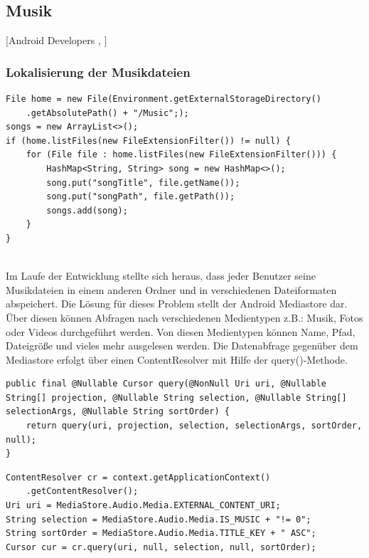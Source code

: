 \documentclass[FIPLY_base.tex]{subfiles}
\begin{document}
\subsection{Musik}
[Android Developers \cite{adMediaPlayer}, \citeauthor{bMediaPlayer} \cite{bMediaPlayer}]

\subsubsection{Lokalisierung der Musikdateien}
\begin{lstlisting}[caption={Ursprünglicher Ansatz zum Lesen aller mp3-Files im Music-Ordner},label=DescriptiveLabel]
File home = new File(Environment.getExternalStorageDirectory()
	.getAbsolutePath() + "/Music";);
songs = new ArrayList<>();
if (home.listFiles(new FileExtensionFilter()) != null) {
	for (File file : home.listFiles(new FileExtensionFilter())) {
		HashMap<String, String> song = new HashMap<>();
		song.put("songTitle", file.getName());
		song.put("songPath", file.getPath());
		songs.add(song);
	}
}    
\end{lstlisting}

\ \\
Im Laufe der Entwicklung stellte sich heraus, dass jeder Benutzer seine Musikdateien in einem anderen Ordner und in verschiedenen Dateiformaten abspeichert. 
Die Lösung für dieses Problem stellt der Android Mediastore dar. 
Über diesen können Abfragen nach verschiedenen Medientypen z.B.: Musik, Fotos oder Videos durchgeführt werden. Von diesen Medientypen können Name, Pfad, Dateigröße und vieles mehr ausgelesen werden.
Die Datenabfrage gegenüber dem Mediastore erfolgt über einen ContentResolver mit Hilfe der query()-Methode.
\begin{lstlisting}[caption={Die query-Methode des Android Source Codes in der \citetitle{acContentResolver} Klasse \cite{acContentResolver}},label=DescriptiveLabel]
public final @Nullable Cursor query(@NonNull Uri uri, @Nullable String[] projection, @Nullable String selection, @Nullable String[] selectionArgs, @Nullable String sortOrder) {
	return query(uri, projection, selection, selectionArgs, sortOrder, null);
}
\end{lstlisting}
\begin{lstlisting}[caption={Alle Audiodateien, die Musik beinhalten, werden gesucht.},label=DescriptiveLabel]
ContentResolver cr = context.getApplicationContext()
	.getContentResolver();
Uri uri = MediaStore.Audio.Media.EXTERNAL_CONTENT_URI;
String selection = MediaStore.Audio.Media.IS_MUSIC + "!= 0";
String sortOrder = MediaStore.Audio.Media.TITLE_KEY + " ASC";
Cursor cur = cr.query(uri, null, selection, null, sortOrder);
\end{lstlisting}
\end{document}

